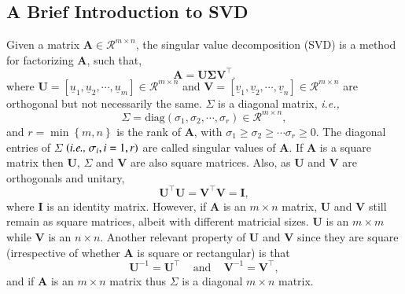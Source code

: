 \documentclass[preprint,12pt]{elsarticle}
\newcommand{\ie}{{\it i.e., }}
\begin{document}
\subsection{A Brief Introduction to SVD}\label{subsection:svd_brief}
Given a matrix $\mathbf{A}\in\mathcal{R}^{m\times n}$, the singular value decomposition (SVD) is a method for factorizing $\mathbf{A}$, such that,
\begin{equation}
  \mathbf{A} = \mathbf{U}\mathbf{\Sigma}\mathbf{V}^{\intercal}.
\end{equation}
where $\mathbf{U}=\left[\underline{u}_{1},\underline{u}_{2},\cdots,\underline{u}_{m}\right]\in\mathcal{R}^{m\times n}$ and $\mathbf{V}=\left[\underline{v}_{1},\underline{v}_{2},\cdots,\underline{v}_{n}\right]\in\mathcal{R}^{m\times n}$ are orthogonal but not necessarily the same. $\Sigma$ is a diagonal matrix, \ie
\begin{displaymath}
  \Sigma=\text{diag}\left(\sigma_{1},\sigma_{2},\cdots,\sigma_{r}\right)\in\mathcal{R}^{m\times n},
\end{displaymath}
and $r=\min\left\{m,n\right\}$ is the rank of $\mathbf{A}$, with $\sigma_{1}\ge\sigma_{2}\ge\cdots\sigma_{r}\ge 0$. The diagonal entries of $\Sigma$ $\left(\text{\ie} \sigma_{i}, i=1,r\right)$ are called singular values of $\mathbf{A}$. If $\mathbf{A}$ is a square matrix then $\mathbf{U}$, $\Sigma$ and $\mathbf{V}$ are also square matrices. Also, as $\mathbf{U}$ and $\mathbf{V}$ are orthogonals and unitary, 
\begin{equation}
  \mathbf{U}^{\intercal}\mathbf{U} = \mathbf{V}^{\intercal}\mathbf{V} = \mathbf{I},
\end{equation}
where $\mathbf{I}$ is an identity matrix. However, if $\mathbf{A}$ is an $m\times n$ matrix, $\mathbf{U}$ and $\mathbf{V}$ still remain as square matrices, albeit with different matricial sizes. $\mathbf{U}$ is an $m\times m$ while $\mathbf{V}$ is an $n\times n$. Another relevant property of $\mathbf{U}$ and $\mathbf{V}$ since they are square (irrespective of whether $\mathbf{A}$ is square or rectangular) is that
\begin{equation}
  \mathbf{U}^{-1} = \mathbf{U}^{\intercal} \;\;\;\text{ and }\;\;\; \mathbf{V}^{-1} = \mathbf{V}^{\intercal},
\end{equation}
and if $\mathbf{A}$ is an $m \times n$ matrix thus $\Sigma$ is a diagonal $m \times n$ matrix.
\end{document}
